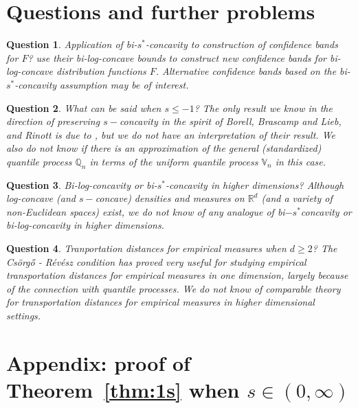 \documentclass[11pt]{amsart}
\numberwithin{equation}{section}
\newcommand{\RR}{\mathbb{R}}
\newcommand{\VV}{\mathbb{V}}
\newcommand{\QQ}{\mathbb{Q}}
\theoremstyle{definition}\newtheorem{definition}{Definition}
\theoremstyle{remark}\newtheorem{assumption}{Assumption}
\theoremstyle{remark}\newtheorem{remark}{Remark}
\theoremstyle{definition}\newtheorem{example}{Example}
\theoremstyle{plain}\newtheorem{question}{Question}
\theoremstyle{plain}\newtheorem{theorem}{Theorem}
\theoremstyle{plain}\newtheorem{lemma}{Lemma}
\theoremstyle{plain}\newtheorem{proposition}{Proposition}
\theoremstyle{plain}\newtheorem{corollary}{Corollary}
\theoremstyle{plain}\newtheorem{conjecture}{Conjecture}
\begin{document}
\section{Questions and further problems}
\label{sec:QuestAndProb}

\begin{question}
{\rm Application of bi-$s^*$-concavity to construction of confidence bands for $F$?}
\cite{DuembgenKW:2017}  use their bi-log-concave bounds to construct new confidence bands for bi-log-concave 
distribution functions $F$.  Alternative confidence bands based on the bi-$s^*$-concavity 
assumption may be of interest.
\end{question}
\begin{question}
{\rm What can be said when $s \le -1$?}  The only result we know in the direction of 
preserving $s-$concavity in the spirit of Borell, Brascamp and Lieb, and Rinott is due to 
\cite{MR572660}, but we do not have an interpretation of their result.  %
We also do not know if there is an approximation of the general (standardized) quantile process $\QQ_n$ in terms of the uniform
quantile process $\VV_n$ in this case.
\end{question}
\begin{question}
{\rm Bi-log-concavity or bi-$s^*$-concavity in higher dimensions?}
Although log-concave (and $s-$concave) densities and measures on $\RR^d$ (and a variety of non-Euclidean spaces) exist,
we do not know of any analogue of bi$-s^*$concavity or bi-log-concavity in higher dimensions.
\end{question}
\begin{question}
{\rm Tranportation distances for empirical measures when $d\ge2$?}
The Cs\"org\H{o} - R\'ev\'esz condition has proved very useful for studying empirical transportation 
distances for empirical measures in one dimension, largely because of the connection with quantile 
processes.  We do not know of comparable theory for  transportation distances for empirical measures
in higher dimensional settings.
\end{question}

\section{Appendix:  proof of Theorem~\ref{thm:1s} when $s \in (0,\infty)$}
\label{sec:appendix}
\end{document}
